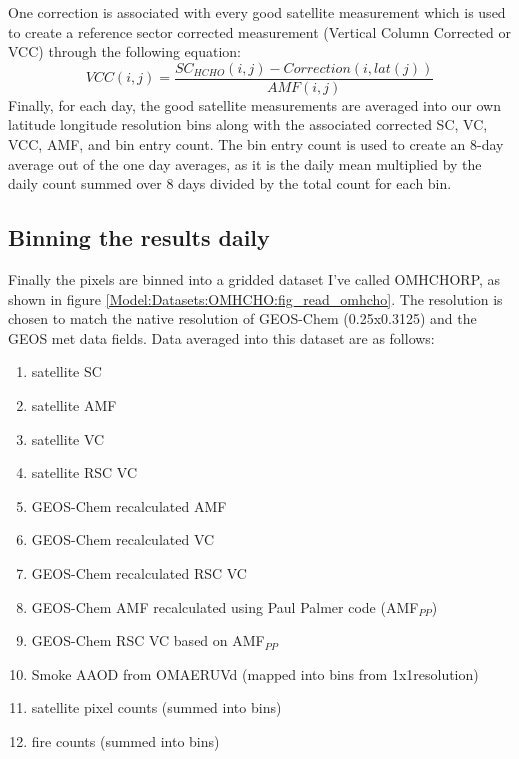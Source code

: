     One correction is associated with every good satellite measurement which is used to create a reference sector corrected measurement (Vertical Column Corrected or VCC) through the following equation:
    \begin{equation}
    VCC(i,j) = \frac{SC_{HCHO}(i,j) - Correction(i,lat(j))}{AMF(i,j)}
    \end{equation}
    Finally, for each day, the good satellite measurements are averaged into our own latitude longitude resolution bins along with the associated corrected SC, VC, VCC, AMF, and bin entry count.
    The bin entry count is used to create an 8-day average out of the one day averages, as it is the daily mean multiplied by the daily count summed over 8 days divided by the total count for each bin.
  
  \subsection{Binning the results daily}
    
    Finally the pixels are binned into a gridded dataset I've called OMHCHORP, as shown in figure \ref{Model:Datasets:OMHCHO:fig_read_omhcho}.
    The resolution is chosen to match the native resolution of GEOS-Chem (0.25x0.3125\degr) and the GEOS met data fields.
    Data averaged into this dataset are as follows:
    \begin{enumerate}
      \item satellite SC %
      \item satellite AMF %
      \item satellite VC %
      \item satellite RSC VC %
      \item GEOS-Chem recalculated AMF %
      \item GEOS-Chem recalculated VC %
      \item GEOS-Chem recalculated RSC VC %
      \item GEOS-Chem AMF recalculated using Paul Palmer code (AMF$_{PP}$)
      \item GEOS-Chem RSC VC based on AMF$_{PP}$
      \item Smoke AAOD from OMAERUVd (mapped into bins from 1x1\degr resolution)
      \item satellite pixel counts (summed into bins)
      \item fire counts (summed into bins)
    \end{enumerate}
    
